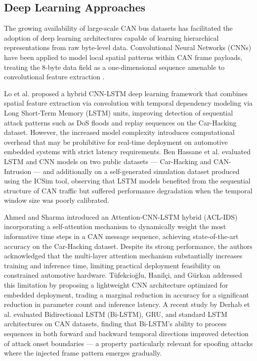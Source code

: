 \documentclass[conference]{IEEEtran}
\begin{document}
\subsection{Deep Learning Approaches}

The growing availability of large-scale CAN bus datasets has facilitated the adoption of deep learning architectures capable of learning hierarchical representations from raw byte-level data. Convolutional Neural Networks (CNNs) have been applied to model local spatial patterns within CAN frame payloads, treating the 8-byte data field as a one-dimensional sequence amenable to convolutional feature extraction \cite{DESTA2022100470}.

Lo et al. \cite{11098515} proposed a hybrid CNN-LSTM deep learning framework that combines spatial feature extraction via convolution with temporal dependency modeling via Long Short-Term Memory (LSTM) units, improving detection of sequential attack patterns such as DoS floods and replay sequences on the Car-Hacking dataset. However, the increased model complexity introduces computational overhead that may be prohibitive for real-time deployment on automotive embedded systems with strict latency requirements. Ben Hassane et al. \cite{LO2022100471} evaluated LSTM and CNN models on two public datasets — Car-Hacking and CAN-Intrusion — and additionally on a self-generated simulation dataset produced using the ICSim tool, observing that LSTM models benefited from the sequential structure of CAN traffic but suffered performance degradation when the temporal window size was poorly calibrated.

Ahmed and Sharma \cite{s23073610} introduced an Attention-CNN-LSTM hybrid (ACL-IDS) incorporating a self-attention mechanism to dynamically weight the most informative time steps in a CAN message sequence, achieving state-of-the-art accuracy on the Car-Hacking dataset. Despite its strong performance, the authors acknowledged that the multi-layer attention mechanism substantially increases training and inference time, limiting practical deployment feasibility on constrained automotive hardware. Tüfekcioğlu, Hanilçi, and Gürkan \cite{article_taneja} addressed this limitation by proposing a lightweight CNN architecture optimized for embedded deployment, trading a marginal reduction in accuracy for a significant reduction in parameter count and inference latency. A recent study by Derhab et al. \cite{article_samir} evaluated Bidirectional LSTM (Bi-LSTM), GRU, and standard LSTM architectures on CAN datasets, finding that Bi-LSTM's ability to process sequences in both forward and backward temporal directions improved detection of attack onset boundaries — a property particularly relevant for spoofing attacks where the injected frame pattern emerges gradually.
\end{document}
